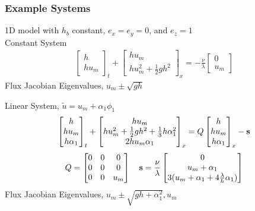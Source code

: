 \documentclass[10pt]{beamer}
\begin{document}
    \begin{frame}
      \frametitle{Example Systems}
      1D model with \(h_b\) constant, \(e_x = e_y = 0\), and \(e_z = 1\) \\
      Constant System
      \begin{align*}
        \begin{bmatrix}
          h \\
          h u_m
        \end{bmatrix}_t +
        \begin{bmatrix}
          h u_m \\
          h u_m^2 + \frac{1}{2} g h^2
        \end{bmatrix}_x =
        -\frac{\nu}{\lambda}
        \begin{bmatrix}
          0 \\
          u_m
        \end{bmatrix}
      \end{align*}
      Flux Jacobian Eigenvalues, \(u_m \pm \sqrt{gh}\)

      Linear System, \(\tilde{u} = u_m + \alpha_1 \phi_1\)
      \begin{align*}
        \begin{bmatrix}
          h \\
          hu_m \\
          h \alpha_1
        \end{bmatrix}_t +
        \begin{bmatrix}
          h u_m \\
          h u_m^2 + \frac{1}{2} gh^2 + \frac{1}{3}h \alpha_1^2 \\
          2 h u_m \alpha_1
        \end{bmatrix}_x = Q
        \begin{bmatrix}
          h \\
          hu_m \\
          h \alpha_1
        \end{bmatrix}_x - \mathbf{s}
      \end{align*}
      \begin{align*}
        Q =
        \begin{bmatrix}
          0 & 0 & 0 \\
          0 & 0 & 0 \\
          0 & 0 & u_m
        \end{bmatrix} \quad
        \mathbf{s} = \frac{\nu}{\lambda}
        \begin{bmatrix}
          0 \\
          u_m + \alpha_1 \\
          3(u_m + \alpha_1 + 4\frac{\lambda}{h} \alpha_1)
        \end{bmatrix}
      \end{align*}
      Flux Jacobian Eigenvalues, \(u_m \pm \sqrt{gh + \alpha_1^2}, u_m\)
    \end{frame}
\end{document}
